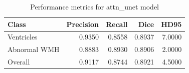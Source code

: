 \begin{table}
\caption{Performance metrics for attn_unet model}
\label{tab:attn_unet_metrics}
\begin{tabular}{lrrrr}
\toprule
Class & Precision & Recall & Dice & HD95 \\
\midrule
Ventricles & 0.9350 & 0.8558 & 0.8937 & 7.0000 \\
Abnormal WMH & 0.8883 & 0.8930 & 0.8906 & 2.0000 \\
Overall & 0.9117 & 0.8744 & 0.8921 & 4.5000 \\
\bottomrule
\end{tabular}
\end{table}
